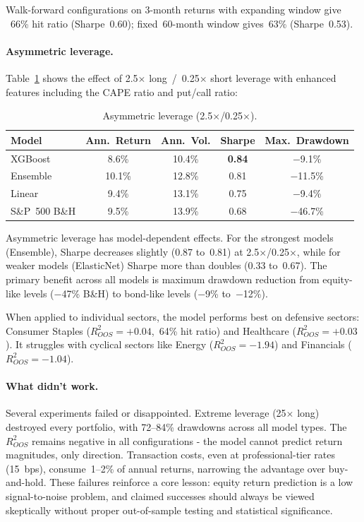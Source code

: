 \documentclass{article}
\begin{document}
Walk-forward configurations on 3-month returns with expanding window give
~66\% hit ratio (Sharpe~0.60); fixed~60-month window gives~63\%
(Sharpe~0.53).

\paragraph{Asymmetric leverage.}
Table~\ref{tab:leverage} shows the effect of 2.5$\times$ long~/~0.25$\times$
short leverage with enhanced features including the CAPE ratio and put/call
ratio:

\begin{table}[ht]
\centering
\caption{Asymmetric leverage (2.5$\times$/0.25$\times$).}
\label{tab:leverage}
\begin{tabular}{lcccc}
\toprule
Model & Ann.\ Return & Ann.\ Vol. & Sharpe & Max.\ Drawdown \\
\midrule
XGBoost & 8.6\% & 10.4\% & \textbf{0.84} & $-$9.1\% \\
Ensemble & 10.1\% & 12.8\% & 0.81 & $-$11.5\% \\
Linear & 9.4\% & 13.1\% & 0.75 & $-$9.4\% \\
S\&P~500 B\&H & 9.5\% & 13.9\% & 0.68 & $-$46.7\% \\
\bottomrule
\end{tabular}
\end{table}

Asymmetric leverage has model-dependent effects. For the strongest
models (Ensemble), Sharpe decreases slightly (0.87 to~0.81) at
2.5$\times$/0.25$\times$, while for weaker models (ElasticNet) Sharpe
more than doubles (0.33 to~0.67). The primary benefit across all models is
maximum drawdown reduction from equity-like levels ($-$47\% B\&H) to
bond-like levels ($-$9\% to~$-$12\%).

When applied to individual sectors, the model performs best on defensive
sectors: Consumer Staples ($R^2_{OOS}=+0.04$,~64\% hit ratio) and Healthcare
($R^2_{OOS}=+0.03$). It struggles with cyclical sectors like Energy
($R^2_{OOS}=-1.94$) and Financials ($R^2_{OOS}=-1.04$).

\paragraph{What didn't work.}
Several experiments failed or disappointed. Extreme leverage (25$\times$ long) destroyed every
portfolio, with 72--84\% drawdowns across all model types. The $R^2_{OOS}$
remains negative in all configurations - the model cannot predict return
magnitudes, only direction.  Transaction costs, even at professional-tier
rates (15~bps), consume~1--2\% of annual returns, narrowing the advantage
over buy-and-hold. These failures reinforce a core lesson:
equity return prediction is a low signal-to-noise problem, and claimed
successes should always be viewed skeptically without proper out-of-sample
testing and statistical significance.
\end{document}

